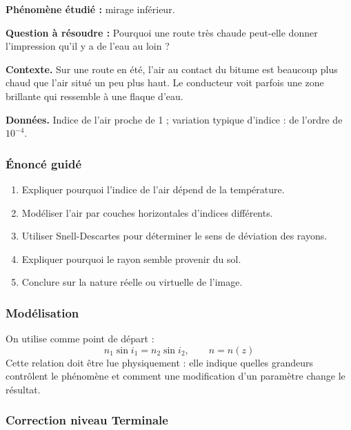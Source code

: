 \documentclass[11pt,a4paper]{article}
\begin{document}
\begin{exercicebox}
\textbf{Phénomène étudié :} mirage inférieur.

\medskip
\textbf{Question à résoudre :} Pourquoi une route très chaude peut-elle donner l'impression qu'il y a de l'eau au loin ?

\medskip
\textbf{Contexte.} Sur une route en été, l'air au contact du bitume est beaucoup plus chaud que l'air situé un peu plus haut. Le conducteur voit parfois une zone brillante qui ressemble à une flaque d'eau.

\medskip
\textbf{Données.} Indice de l'air proche de 1 ; variation typique d'indice : de l'ordre de \(10^{-4}\).
\end{exercicebox}

\subsubsection*{Énoncé guidé}

\begin{enumerate}
  \item Expliquer pourquoi l'indice de l'air dépend de la température.
  \item Modéliser l'air par couches horizontales d'indices différents.
  \item Utiliser Snell-Descartes pour déterminer le sens de déviation des rayons.
  \item Expliquer pourquoi le rayon semble provenir du sol.
  \item Conclure sur la nature réelle ou virtuelle de l'image.
\end{enumerate}

\subsubsection*{Modélisation}

\begin{theorembox}
On utilise comme point de départ :
\[
n_1\sin i_1=n_2\sin i_2,\qquad n=n(z)
\]
Cette relation doit être lue physiquement : elle indique quelles grandeurs contrôlent le phénomène et comment une modification d'un paramètre change le résultat.
\end{theorembox}

\subsubsection*{Correction niveau Terminale}
\end{document}
